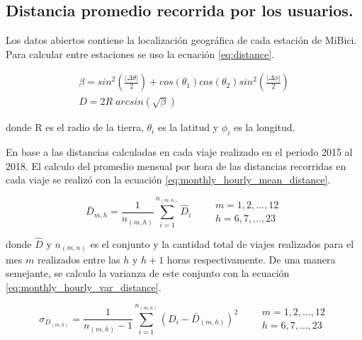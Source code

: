 \subsection{Distancia promedio recorrida por los usuarios.}

Los datos abiertos contiene la localización geográfica de cada estación de MiBici. Para calcular entre estaciones se uso la ecuación \ref{eq:distance}.

\begin{equation}
    \begin{matrix}
        \beta = sin^2\left ( \frac{|\Delta \theta|}{2} \right ) + cos \left (\theta_1\right )  cos(\theta_2)sin^2 \left (\frac{|\Delta \phi|}{2} \right ) \\
        D     = 2R\;arcsin\left (\sqrt{\beta} \right )
    \end{matrix}
    \label{eq:distance}
\end{equation}

donde R es el radio de la tierra, $\theta_i$ es la latitud y $\phi_i$ es la longitud.

En base a las distancias calculadas en cada viaje realizado en el periodo 2015 al 2018. El calculo del promedio mensual por hora de las distancias recorridas en cada viaje se realizó con la ecuación \ref{eq:monthly_hourly_mean_distance}.

\begin{equation}
    \bar{D}_{m,h} = \frac{1}{n_{(m,h)}} \sum_{i=1}^{n_{(m,n)}} \hat{D}_{i} \qquad \begin{matrix}
        m=1,2,\dots,12 \\ h=6,7,\dots,23
    \end{matrix} \label{eq:monthly_hourly_mean_distance}
\end{equation}

donde $\hat{D}$ y $n_{(m,n)}$ es el conjunto y la cantidad total de viajes realizados para el mes $m$ realizados entre las $h$ y $h+1$ horas respectivamente. De una manera semejante, se calculo la varianza de este conjunto con la ecuación \ref{eq:monthly_hourly_var_distance}.

\begin{equation}
    \sigma_{D_{(m,h)}} = \frac{1}{n_{(m,h)}-1} \sum_{i=1}^{n_{(m,n)}} (D_i-\bar{D}_{(m,h)})^2 \qquad \begin{matrix}
        m=1,2,\dots,12 \\ h=6,7,\dots,23
    \end{matrix} \label{eq:monthly_hourly_var_distance}
\end{equation}

